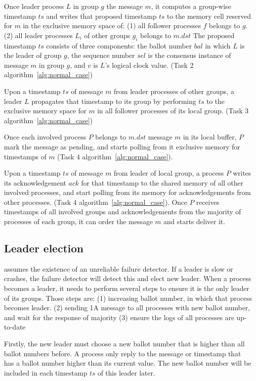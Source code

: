 Once leader process $L$ in group $g$ \lread the message $m$, it computes a
group-wise timestamp $ts$ and writes that proposed timestamp $ts$ to the memory
cell reserved for $m$ in the exclusive memory space of: (1) all follower
processes $f$ belongs to $g$. (2) all leader processes $L_i$ of other groups
$g_i$ belongs to $m.dst$ The proposed timestamp $ts$ consists of three
components: the ballot number $bal$ in which $L$ is the leader of group $g$, the
sequence number $sel$ is the consensus instance of message $m$ in group $g$, and
$v$ is $L$'s logical clock value. (Task 2 algorithm~\ref{alg:normal_case})

Upon \lread a timestamp $ts$ of message $m$ from leader processes of other
groups, a leader $L$ propagates that timestamp to its group by performing
\rwrite $ts$ to the exclusive memory space for $m$ in all follower processes of
its local group. (Task 3 algorithm~\ref{alg:normal_case})

Once each involved process $P$ belongs to $m.dst$ \lread message $m$ in its
local buffer, $P$ mark the message as pending, and starts polling from it
exclusive memory for timestamps of $m$ (Task 4 algorithm~\ref{alg:normal_case}).

Upon \lread a timestamp $ts$ of message $m$ from leader of local group, a
process $P$ writes its acknowledgement $ack$ for that timestamp to the shared
memory of all other involved processes, and start polling from its memory for
acknowledgements from other processes. (Task 4 algorithm~\ref{alg:normal_case}).
Once $P$ receives timestamps of all involved groups and acknowledgements from
the majority of processes of each group, it can order the message $m$ and starts
deliver it.

\subsection{Leader election}

\proto assumes the existence of an unreliable failure detector. If a leader is
slow or crashes, the failure detector will detect this and elect new leader.
When a process becomes a leader, it needs to perform several steps to ensure it
is the only leader of its groups. Those steps are: (1) increasing ballot number,
in which that process becomes leader. (2) sending 1A message to all processes
with new ballot number, and wait for the response of majority (3) ensure the
logs of all processes are up-to-date

Firstly, the new leader must choose a new ballot number that is higher than all
ballot numbers before. A process only reply to the message or timestamp that has
a ballot number higher than its current value. The new ballot number will be
included in each timestamp $ts$ of this leader later.

